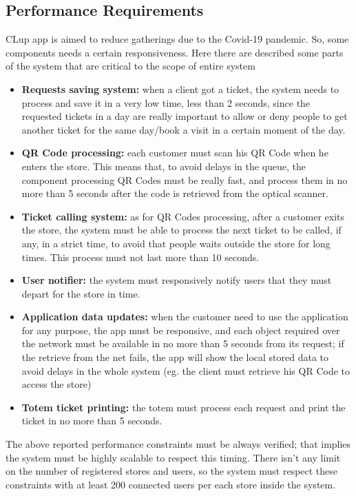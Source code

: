 \documentclass{article}
\begin{document}
	\subsection{Performance Requirements}
	CLup app is aimed to reduce gatherings due to the Covid-19 pandemic. So, some components needs a certain responsiveness. Here there are described some parts of the system that are critical to the scope of entire system
	\begin{itemize}
		\item {\bfseries Requests saving system:} when a client got a ticket, the system needs to process and save it in a very low time, less than 2 seconds,  since the requested tickets in a day are really important to allow or deny people to get another ticket for the same day/book a visit in a certain moment of the day.  
		\item {\bfseries QR Code processing:} each customer must scan his QR Code when he enters the store. This means that, to avoid delays in the queue, the component processing QR Codes must be really fast, and process them in no more than 5 seconds after the code is retrieved from the optical scanner.
		\item {\bfseries Ticket calling system:} as for QR Codes processing, after a customer exits the store, the system must be able to process the next ticket to be called, if any, in a strict time, to avoid that people waits outside the store for long times. This process must not last more than 10 seconds.
		\item {\bfseries User notifier: } the system must responsively notify users that they must depart for the store in time. 
		\item{\bfseries Application data updates: } when the customer need to use the application for any purpose, the app must be responsive, and each object required over the network must be available in no more than 5 seconds from its request; if the retrieve from the net fails, the app will show the local stored data to avoid delays in the whole system (eg. the client must retrieve his QR Code to access the store) 
		\item{\bfseries Totem ticket printing: } the totem must process each request and print the ticket in no more than 5 seconds.
	\end{itemize} 
The above reported performance constraints must be always verified; that implies the system must be highly scalable to respect this timing. There isn't any limit on the number of registered stores and users, so the system must respect these constraints with at least 200 connected users per each store inside the system.
\end{document}
